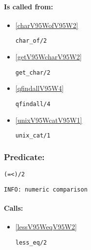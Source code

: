 \paragraph{Is called from:} 
\begin{itemize}
\item \ref{charV95WofV95W2} 
\begin{verbatim}
char_of/2
\end{verbatim}

\item \ref{getV95WcharV95W2} 
\begin{verbatim}
get_char/2
\end{verbatim}

\item \ref{qfindallV95W4} 
\begin{verbatim}
qfindall/4
\end{verbatim}

\item \ref{unixV95WcatV95W1} 
\begin{verbatim}
unix_cat/1
\end{verbatim}

\end{itemize}

\subsubsection{Predicate:} \label{V61WV60WV95W2}

\begin{verbatim}
(=<)/2
\end{verbatim}

{\small \begin{verbatim}
INFO: numeric comparison

\end{verbatim}}
\paragraph{Calls:} 
\begin{itemize}
\item \ref{lessV95WeqV95W2} 
\begin{verbatim}
less_eq/2
\end{verbatim}

\end{itemize}
